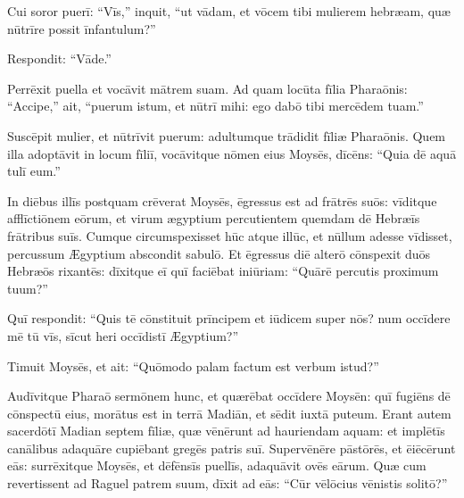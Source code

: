Cui soror puerī: ``Vīs,'' inquit, ``ut vādam, et vōcem tibi mulierem hebræam,
quæ nūtrīre possit īnfantulum?''

Respondit: ``Vāde.''

Perrēxit puella et vocāvit mātrem suam.
Ad quam locūta fīlia Pharaōnis: ``Accipe,'' ait, ``puerum istum, et nūtrī mihi: ego dabō tibi mercēdem tuam.''

Suscēpit mulier, et nūtrīvit puerum: adultumque trādidit fīliæ Pharaōnis. 
Quem illa adoptāvit in locum fīliī,
vocāvitque nōmen eius Moysēs, dīcēns: ``Quia dē aquā tulī eum.''

In diēbus illīs postquam crēverat Moysēs, ēgressus est ad frātrēs suōs:
vīditque afflīctiōnem eōrum, et virum ægyptium percutientem quemdam dē Hebræīs frātribus suīs.
Cumque circumspexisset hūc atque illūc,
et nūllum adesse vīdisset,
percussum Ægyptium abscondit sabulō.
Et ēgressus diē alterō cōnspexit duōs Hebræōs rixantēs:
dīxitque eī quī faciēbat iniūriam: ``Quārē percutis proximum tuum?''

Quī respondit: ``Quis tē cōnstituit prīncipem et iūdicem super nōs?
num occīdere mē tū vīs, sīcut heri occīdistī Ægyptium?''

Timuit Moysēs, et ait: ``Quōmodo palam factum est verbum istud?''

Audīvitque Pharaō sermōnem hunc, et quærēbat occīdere Moysēn:
quī fugiēns dē cōnspectū eius, morātus est in terrā Madiān,
et sēdit iuxtā puteum.
Erant autem sacerdōtī Madian septem fīliæ,
quæ vēnērunt ad hauriendam aquam:
et implētīs canālibus adaquāre cupiēbant gregēs patris suī.
Supervēnēre pāstōrēs, et ēiēcērunt eās:
surrēxitque Moysēs, et dēfēnsīs puellīs, adaquāvit ovēs eārum. 
Quæ cum revertissent ad Raguel patrem suum, dīxit ad eās:
``Cūr vēlōcius vēnistis solitō?''

